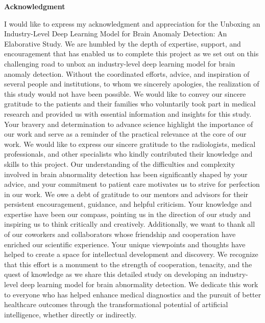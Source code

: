 \begin{center}
    \huge \textbf{Acknowledgment}
\end{center}
\vspace{15mm}
I would like to express my acknowledgment and appreciation for the Unboxing an Industry-Level Deep Learning Model for Brain Anomaly Detection: An Elaborative Study. We are humbled by the depth of expertise, support, and encouragement that has enabled us to complete this project as we set out on this challenging road to unbox an industry-level deep learning model for brain anomaly detection. Without the coordinated efforts, advice, and inspiration of several people and institutions, to whom we sincerely apologies, the realization of this study would not have been possible. We would like to convey our sincere gratitude to the patients and their families who voluntarily took part in medical research and provided us with essential information and insights for this study. Your bravery and determination to advance science highlight the importance of our work and serve as a reminder of the practical relevance at the core of our work. We would like to express our sincere gratitude to the radiologists, medical professionals, and other specialists who kindly contributed their knowledge and skills to this project. Our understanding of the difficulties and complexity involved in brain abnormality detection has been significantly shaped by your advice, and your commitment to patient care motivates us to strive for perfection in our work. We owe a debt of gratitude to our mentors and advisors for their persistent encouragement, guidance, and helpful criticism. Your knowledge and expertise have been our compass, pointing us in the direction of our study and inspiring us to think critically and creatively. Additionally, we want to thank all of our coworkers and collaborators whose friendship and cooperation have enriched our scientific experience. Your unique viewpoints and thoughts have helped to create a space for intellectual development and discovery. We recognize that this effort is a monument to the strength of cooperation, tenacity, and the quest of knowledge as we share this detailed study on developing an industry-level deep learning model for brain abnormality detection. We dedicate this work to everyone who has helped enhance medical diagnostics and the pursuit of better healthcare outcomes through the transformational potential of artificial intelligence, whether directly or indirectly.